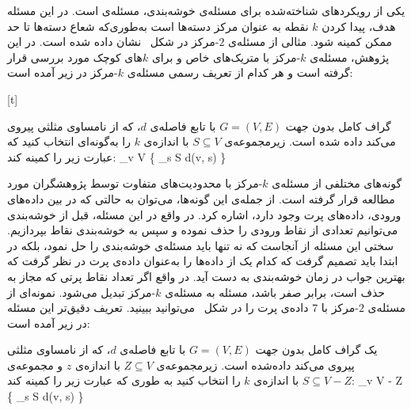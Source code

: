 یکی از رویکردهای شناخته‌شده برای مسئله‌ی خوشه‌بندی، مسئله‌ی  است.
در این مسئله هدف، پیدا کردن $k$ نقطه به عنوان مرکز دسته‌ها است به‌طوری‌که شعاع دسته‌ها تا حد ممکن کمینه شود.
مثالی از مسئله‌ی $2$-مرکز در شکل~ نشان داده شده است.
در این پژوهش، مسئله‌ی $k$-مرکز با متریک‌های خاص و برای $k$های کوچک مورد بررسی قرار گرفته است و هر کدام از‌
تعریف رسمی مسئله‌ی $k$-مرکز در زیر آمده است:

[t]
\vspace{1em}

  گراف کامل بدون جهت $G = (V, E)$ با تابع فاصله‌ی $d$،
که از نامساوی مثلثی پیروی می‌کند داده ‌شده است.
زیرمجموعه‌ی $S \subseteq V$ با اندازه‌ی $k$ را به‌گونه‌ای انتخاب کنید که عبارت زیر را کمینه کند:
\max_{v \in V} \{ \min_{s \in S} d(v, s) \}

گونه‌های مختلفی از مسئله‌ی $k$-مرکز با محدودیت‌های متفاوت توسط پژوهشگران مورد مطالعه قرار گرفته است.
از جمله‌ی این گونه‌ها، می‌توان به حالتی که در بین داده‌های ورودی، داده‌های پرت وجود دارد، اشاره کرد.
در واقع در این مسئله، قبل از خوشه‌بندی می‌توانیم تعدادی از نقاط ورودی را حذف نموده و سپس به خوشه‌بندی نقاط بپردازیم.
سختی این مسئله از آنجاست که نه تنها باید مسئله‌ی خوشه‌بندی را حل نمود، بلکه در ابتدا باید تصمیم گرفت که کدام یک از داده‌ها را به‌عنوان داده‌ی پرت در نظر گرفت که بهترین جواب در زمان خوشه‌بندی به دست آید.
در واقع اگر تعداد نقاط پرتی که مجاز به حذف است، برابر صفر باشد، مسئله به مسئله‌ی $k$-مرکز تبدیل می‌شود.
نمونه‌ای از مسئله‌ی $2$-مرکز با $7$ داده‌ی پرت را در شکل~ می‌توانید ببینید.
تعریف دقیق‌تر این مسئله در زیر آمده است:

 یک گراف کامل بدون جهت $G = (V, E)$ با تابع فاصله‌ی $d$، که از نامساوی مثلثی پیروی می‌کند داده‌شده است.
زیرمجموعه‌ی $Z \subseteq V$ با اندازه‌ی $z$ و  مجموعه‌ی $S \subseteq V - Z$ با اندازه‌ی $k$ را انتخاب کنید به‌ طوری ‌که عبارت زیر را کمینه کند:
\max_{v \in V - Z} \{ \min_{s \in S} d(v, s) \}


